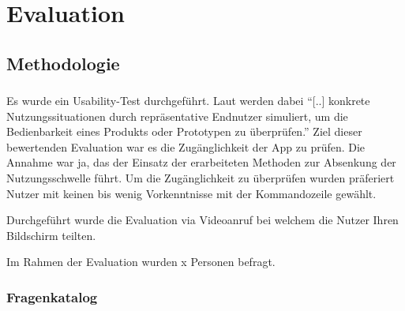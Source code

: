 \documentclass[oneside,bibliography=totocnumbered,BCOR=5mm]{scrbook}
\begin{document}
\chapter{Evaluation}
\section{Methodologie}

\subsection{}






Es wurde ein Usability-Test durchgeführt. Laut \cite[36]{henger2003} werden dabei
``[..] konkrete Nutzungssituationen durch repräsentative Endnutzer simuliert,
um die Bedienbarkeit eines Produkts oder Prototypen zu überprüfen.'' Ziel
dieser bewertenden Evaluation war es die Zugänglichkeit der App zu prüfen. Die
Annahme war ja, das der Einsatz der erarbeiteten Methoden zur Absenkung der
Nutzungsschwelle führt. Um die Zugänglichkeit zu überprüfen wurden präferiert
Nutzer mit keinen bis wenig Vorkenntnisse mit der Kommandozeile gewählt.

Durchgeführt wurde die Evaluation via Videoanruf bei welchem die Nutzer Ihren
Bildschirm teilten.


Im Rahmen der Evaluation wurden x Personen befragt. %

\subsection{Fragenkatalog}
\end{document}
